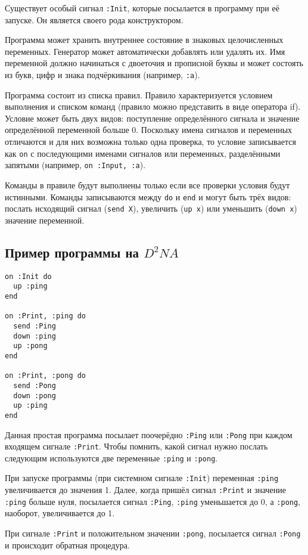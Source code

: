 \documentclass[utf8,a5paper,portrait,10pt,twoside]{eskdtext}
\begin{document}
Существует особый сигнал \texttt{:Init}, которые посылается в программу при её
запуске. Он является своего рода конструктором.

Программа может хранить внутреннее состояние в знаковых целочисленных
переменных. Генератор может автоматически добавлять или удалять их. Имя
переменной должно начинаться с двоеточия и прописной буквы и может состоять из
букв, цифр и знака подчёркивания (например, \texttt{:a}).

Программа состоит из списка правил. Правило характеризуется условием выполнения
и списком команд (правило можно представить в виде оператора if). Условие может
быть двух видов: поступление определённого сигнала и значение определённой
переменной больше 0. Поскольку имена сигналов и переменных отличаются и для
них возможна только одна проверка, то условие записывается как \texttt{on} с
последующими именами сигналов или переменных, разделёнными запятыми (например,
\texttt{on~:Input, :a}).

Команды в правиле будут выполнены только если все проверки условия будут
истинными. Команды записываются между \texttt{do} и \texttt{end} и могут быть
трёх видов: послать исходящий сигнал (\texttt{send X}), увеличить
(\texttt{up~x}) или уменьшить (\texttt{down x}) значение переменной.

\newpage
\subsection{Пример программы на $D^2NA$}
\begin{verbatim}
on :Init do
  up :ping
end

on :Print, :ping do
  send :Ping
  down :ping
  up :pong
end

on :Print, :pong do
  send :Pong
  down :pong
  up :ping
end
\end{verbatim}

Данная простая программа посылает поочерёдно \texttt{:Ping} или \texttt{:Pong}
при каждом входящем сигнале \texttt{:Print}. Чтобы помнить, какой сигнал нужно
послать следующим используются две переменные \texttt{:ping} и \texttt{:pong}.

При запуске программы (при системном сигнале \texttt{:Init}) переменная
\texttt{:ping} увеличивается до значения 1. Далее, когда пришёл сигнал
\texttt{:Print} и значение \texttt{:ping} больше нуля, посылается сигнал
\texttt{:Ping}, \texttt{:ping} уменьшается до 0, а \texttt{:pong}, наоборот,
увеличивается до 1.

При сигнале \texttt{:Print} и положительном значении \texttt{:pong}, посылается
сигнал \texttt{:Pong} и происходит обратная процедура.
\end{document}
